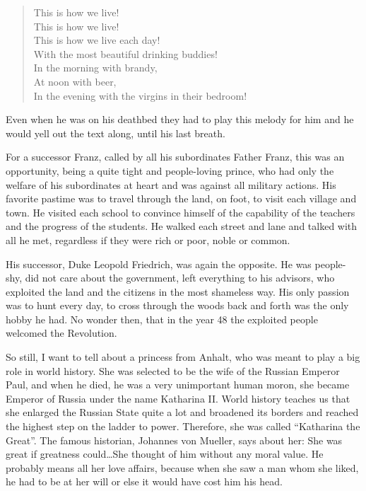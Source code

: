 \documentclass{article}
\begin{document}
\begin{quote}
This is how we live!\\
This is how we live!\\
This is how we live each day!\\
With the most beautiful drinking buddies!\\
In the morning with brandy,\\
At noon with beer,\\
In the evening with the virgins in their bedroom!
\end{quote}

Even when he was on his deathbed they had to play this melody for him and he would yell out the text along, until his last breath.

For a successor Franz, called by all his subordinates Father Franz, this was an opportunity, being a quite tight and people-loving prince, who had only the welfare of his subordinates at heart and was against all military actions. His favorite pastime was to travel through the land, on foot, to visit each village and town. He visited each school to convince himself of the capability of the teachers and the progress of the students. He walked each street and lane and talked with all he met, regardless if they were rich or poor, noble or common.

His successor, Duke Leopold Friedrich, was again the opposite. He was people-shy, did not care about the government, left everything to his advisors, who exploited the land and the citizens in the most shameless way. His only passion was to hunt every day, to cross through the woods back and forth was the only hobby he had. No wonder then, that in the year 48 the exploited people welcomed the Revolution.

So still, I want to tell about a princess from Anhalt, who was meant to play a big role in world history. She was selected to be the wife of the Russian Emperor Paul, and when he died, he was a very unimportant human moron, she became Emperor of Russia under the name Katharina II. World history teaches us that she enlarged the Russian State quite a lot and broadened its borders and reached the highest step on the ladder to power. Therefore, she was called ``Katharina the Great''. The famous historian, Johannes von Mueller, says about her: She was great if greatness could\ldots She thought of him without any moral value. He probably means all her love affairs, because when she saw a man whom she liked, he had to be at her will or else it would have cost him his head.
\end{document}
